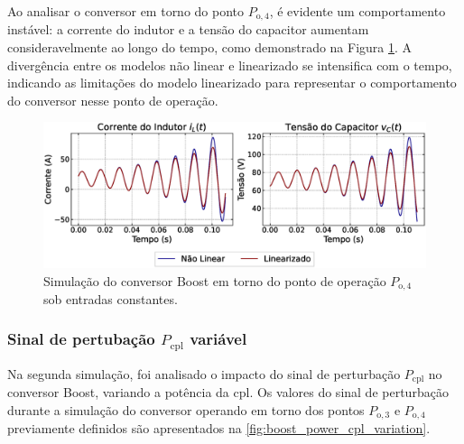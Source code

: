 Ao analisar o conversor em torno do ponto $P_{\mathrm{o}, 4}$, é evidente um comportamento instável: a corrente do indutor e a tensão do capacitor aumentam consideravelmente ao longo do tempo, como demonstrado na Figura \ref{fig:simulation_1_boost_2}. A divergência entre os modelos não linear e linearizado se intensifica com o tempo, indicando as limitações do modelo linearizado para representar o comportamento do conversor nesse ponto de operação.

\begin{figure}[H]
  \centering
  \captionsetup{justification=centering}
  \includegraphics[width=1.\textwidth]{figuras/boost/sim1/op2/result.eps}
  \caption{Simulação do conversor Boost em torno do ponto de operação $P_{\mathrm{o}, 4}$ sob entradas constantes.}
  \label{fig:simulation_1_boost_2}
\end{figure}

\subsubsection{Sinal de pertubação $P_{\textrm{cpl}}$ variável}

Na segunda simulação, foi analisado o impacto do sinal de perturbação $P_{\mathrm{cpl}}$ no conversor Boost, variando a potência da \acrshort{cpl}. Os valores do sinal de perturbação durante a simulação do conversor operando em torno dos pontos $P_{\mathrm{o}, 3}$ e $P_{\mathrm{o}, 4}$ previamente definidos são apresentados na \autoref{fig:boost_power_cpl_variation}.

